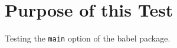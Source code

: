 \documentclass{report}
\begin{document}
\tableofcontents
\chapter{Purpose of this Test}
Testing the \texttt{main} option of the babel package.
\end{document}
